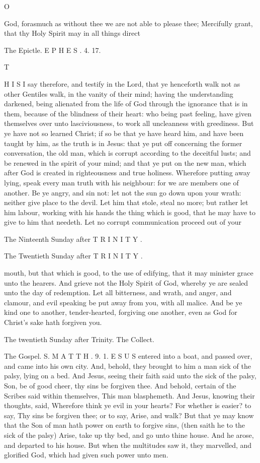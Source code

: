 O

God, forasmuch as without thee we are not able to please thee; Mercifully grant, that thy Holy Spirit may in all things direct

The Epictle. E P H E S . 4. 17.

T

H I S I say therefore, and testify in the Lord, that ye henceforth walk not as other Gentiles walk, in the vanity of their mind; having the understanding darkened, being alienated from the life of God through the ignorance that is in them, because of the blindness of their heart: who being past feeling, have given themselves over unto lasciviousness, to work all uncleanness with greediness. But ye have not so learned Christ; if so be that ye have heard him, and have been taught by him, as the truth is in Jesus: that ye put off concerning the former conversation, the old man, which is corrupt according to the deceitful lusts; and be renewed in the spirit of your mind; and that ye put on the new man, which after God is created in righteousness and true holiness. Wherefore putting away lying, speak every man truth with his neighbour: for we are members one of another. Be ye angry, and sin not: let not the sun go down upon your wrath: neither give place to the devil. Let him that stole, steal no more; but rather let him labour, working with his hands the thing which is good, that he may have to give to him that needeth. Let no corrupt communication proceed out of your

The Ninteenth Sunday after T R I N I T Y .

The Twentieth Sunday after T R I N I T Y .

mouth, but that which is good, to the use of edifying, that it may minister grace unto the hearers. And grieve not the Holy Spirit of God, whereby ye are sealed unto the day of redemption. Let all bitterness, and wrath, and anger, and clamour, and evil speaking be put away from you, with all malice. And be ye kind one to another, tender-hearted, forgiving one another, even as God for Christ’s sake hath forgiven you.

The twentieth Sunday after Trinity. The Collect.

The Gospel. S. M A T T H . 9. 1. E S U S entered into a boat, and passed over, and came into his own city. And, behold, they brought to him a man sick of the palsy, lying on a bed. And Jesus, seeing their faith said unto the sick of the palsy, Son, be of good cheer, thy sins be forgiven thee. And behold, certain of the Scribes said within themselves, This man blasphemeth. And Jesus, knowing their thoughts, said, Wherefore think ye evil in your hearts? For whether is easier? to say, Thy sins be forgiven thee; or to say, Arise, and walk? But that ye may know that the Son of man hath power on earth to forgive sins, (then saith he to the sick of the palsy) Arise, take up thy bed, and go unto thine house. And he arose, and departed to his house. But when the multitudes saw it, they marvelled, and glorified God, which had given such power unto men.

